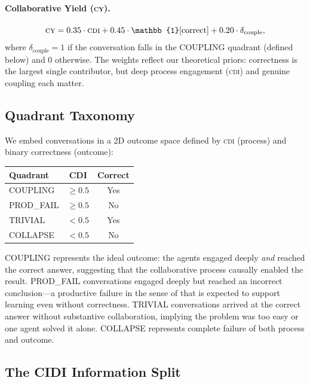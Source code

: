 \documentclass{article}
\newcommand{\CDI}{\textsc{cdi}}
\newcommand{\CY}{\textsc{cy}}
\begin{document}
\paragraph{Collaborative Yield (\CY).}
\begin{equation}
  \CY = 0.35 \cdot \CDI + 0.45 \cdot \mathbb{1}[\text{correct}]
        + 0.20 \cdot \delta_{\text{couple}},
\end{equation}
where $\delta_{\text{couple}} = 1$ if the conversation falls in the
COUPLING quadrant (defined below) and $0$ otherwise. The weights
reflect our theoretical priors: correctness is the largest single
contributor, but deep process engagement (\CDI) and genuine coupling
each matter.

\subsection{Quadrant Taxonomy}

We embed conversations in a 2D outcome space defined by \CDI{}
(process) and binary correctness (outcome):

\begin{center}
\begin{tabular}{lcc}
  \toprule
  \textbf{Quadrant} & \textbf{CDI} & \textbf{Correct} \\
  \midrule
  COUPLING  & $\geq 0.5$ & Yes \\
  PROD\_FAIL & $\geq 0.5$ & No  \\
  TRIVIAL    & $< 0.5$   & Yes \\
  COLLAPSE   & $< 0.5$   & No  \\
  \bottomrule
\end{tabular}
\end{center}

COUPLING represents the ideal outcome: the agents engaged deeply
\emph{and} reached the correct answer, suggesting that the
collaborative process causally enabled the result. PROD\_FAIL
conversations engaged deeply but reached an incorrect conclusion---a
productive failure in the sense of \citet{kapur2016examining} that is
expected to support learning even without correctness. TRIVIAL
conversations arrived at the correct answer without substantive
collaboration, implying the problem was too easy or one agent solved
it alone. COLLAPSE represents complete failure of both process and
outcome.

\subsection{The CIDI Information Split}
\label{sec:cidi}
\end{document}
